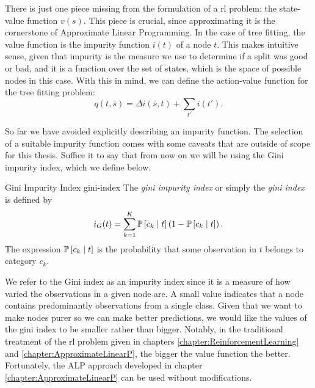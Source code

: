 There is just one piece missing from the formulation of a \ac{rl} problem: the
state-value function $v(s)$. This piece is crucial, since approximating it is
the cornerstone of Approximate Linear Programming. In the case of tree fitting,
the value function is the impurity function $i(t)$ of a node $t$. This makes
intuitive sense, given that impurity is the measure we use to determine if a
split was good or bad, and it is a function over the set of states, which is the
space of possible nodes in this case. With this in mind, we can define the
action-value function for the tree fitting problem:
\begin{equation}
    q (t, \bar{s}) = \Delta i(\bar{s}, t) + \sum_{t'} i (t').
\end{equation}

So far we have avoided explicitly describing an impurity function. The selection
of a suitable impurity function comes with some caveats that are outside of
scope for this thesis. Suffice it to say that from now on we will be using the
Gini impurity index, which we define below.

\begin{dfn}{Gini Impurity Index \cite[Ch.~8.1.2]{intro2statslearning} }{gini-index}
    The \emph{gini impurity index} or simply the \emph{gini index} is defined by
    \begin{equation}
        i_{G}(t) = \sum_{k=1}^{K} \mathbb{P}\left[c_k \mid t\right] \left( 1 - \mathbb{P}\left[c_k \mid t\right] \right).
    \end{equation}
    The expression $\mathbb{P}\left[c_k \mid t\right]$ is the probability that some observation in
    $t$ belongs to category $c_k$.
\end{dfn}

We refer to the Gini index as an impurity index since it is a measure of how
varied the observations in a given node are. A small value indicates that a node
contains predominantly observations from a single class. Given that we want to
make nodes purer so we can make better predictions, we would like the values of
the gini index to be smaller rather than bigger. Notably, in the traditional
treatment of the \ac{rl} problem given in chapters
\ref{chapter:ReinforcementLearning} and \ref{chapter:ApproximateLinearP}, the
bigger the value function the better. Fortunately, the ALP approach developed in
chapter \ref{chapter:ApproximateLinearP} can be used without modifications.


